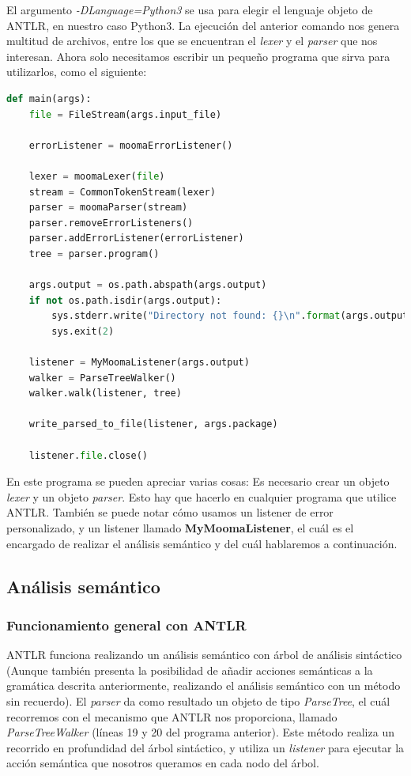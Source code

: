 \documentclass{pre-tfg}
\begin{document}
El argumento \textit{-DLanguage=Python3} se usa para elegir el lenguaje objeto de ANTLR, en nuestro caso Python3. La ejecución del anterior comando nos genera multitud de archivos, entre los que se encuentran el \textit{lexer} y el \textit{parser} que nos interesan. Ahora solo necesitamos escribir un pequeño programa que sirva para utilizarlos, como el siguiente:

\begin{lstlisting}[caption=Programa Main para la ejecución de los analizadores léxico y sintáctico., language=Python]
def main(args):
    file = FileStream(args.input_file)

    errorListener = moomaErrorListener()

    lexer = moomaLexer(file)
    stream = CommonTokenStream(lexer)
    parser = moomaParser(stream)
    parser.removeErrorListeners()
    parser.addErrorListener(errorListener)
    tree = parser.program()

    args.output = os.path.abspath(args.output)
    if not os.path.isdir(args.output):
        sys.stderr.write("Directory not found: {}\n".format(args.output))
        sys.exit(2)

    listener = MyMoomaListener(args.output)
    walker = ParseTreeWalker()
    walker.walk(listener, tree)

    write_parsed_to_file(listener, args.package)

    listener.file.close()
\end{lstlisting}

En este programa se pueden apreciar varias cosas: Es necesario crear un objeto \textit{lexer} y un objeto \textit{parser}. Esto hay que hacerlo en cualquier programa que utilice ANTLR. También se puede notar cómo usamos un listener de error personalizado, y un listener llamado \textbf{MyMoomaListener}, el cuál es el encargado de realizar el análisis semántico y del cuál hablaremos a continuación.

\subsection{Análisis semántico}
\subsubsection{Funcionamiento general con ANTLR}
ANTLR funciona realizando un análisis semántico con árbol de análisis sintáctico (Aunque también presenta la posibilidad de añadir acciones semánticas a la gramática descrita anteriormente, realizando el análisis semántico con un método sin recuerdo). El \textit{parser} da como resultado un objeto de tipo \textit{ParseTree}, el cuál recorremos con el mecanismo que ANTLR nos proporciona, llamado \textit{ParseTreeWalker} (líneas 19 y 20 del programa anterior). Este método realiza un recorrido en profundidad del árbol sintáctico, y utiliza un \textit{listener} para ejecutar la acción semántica que nosotros queramos en cada nodo del árbol. 
\end{document}
